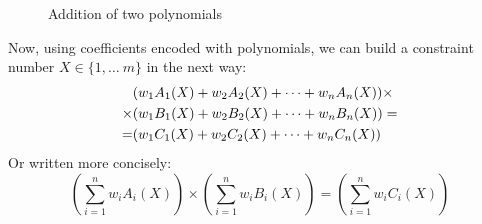 \documentclass{zkdl-presentation-template}
\begin{document}
\begin{frame}
\begin{figure}[H]
            \caption{Addition of two polynomials}
            \label{fig:example-polynomial-addition}
        \end{figure}
    \end{frame}

    \begin{frame}
        \vspace{-5pt}
        Now, using coefficients encoded with polynomials, we can build a constraint number 
        $X \in \{1, \dots\ m\}$ in the next way:
        \vspace{-5pt}
        \begin{align*}
            &(w_1A_1(X) + w_2A_2(X) + \dots + w_nA_n(X)) \times \\
            \times &(w_1B_1(X) + w_2B_2(X) + \dots + w_nB_n(X)) = \\ 
            = &(w_1C_1(X) + w_2C_2(X) + \dots + w_nC_n(X))
            \vspace{-5pt}
        \end{align*}
        \pause
        Or written more concisely:
        \vspace{-5pt}
        \begin{equation*}
            \left( \sum_{i = 1}^{n} w_iA_i(X) \right) \times \left( \sum_{i = 1}^{n} w_iB_i(X) \right) = \left( \sum_{i = 1}^{n} w_iC_i(X) \right)
        \end{equation*}        
    \end{frame}
\end{document}
